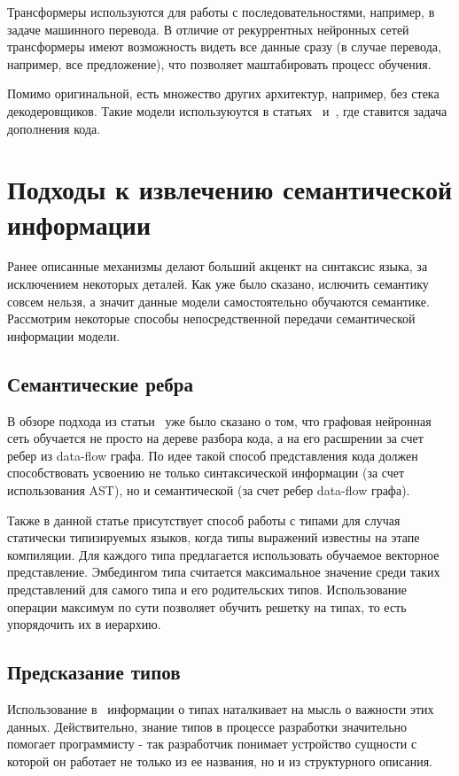 \documentclass[times,specification,annotation]{itmo-student-thesis}
\begin{document}
Трансформеры используются для работы с последовательностями, например, в задаче машинного перевода. В отличие от рекуррентных нейронных сетей трансформеры имеют возможность видеть все данные сразу (в случае перевода, например, все предложение), что позволяет маштабировать процесс обучения.

Помимо оригинальной, есть множество других архитектур, например, без стека декодеровщиков. Такие модели используюутся в статьях~\cite{intelli} и~\cite{slm}, где ставится задача дополнения кода.

\section{Подходы к извлечению семантической информации}\label{sec:semantic}
Ранее описанные механизмы делают больший акценкт на синтаксис языка, за исключением некоторых деталей. Как уже было сказано, ислючить семантику совсем нельзя, а значит данные модели самостоятельно обучаются семантике. Рассмотрим некоторые способы непосредственной передачи семантической информации модели.

\subsection{Семантические ребра}\label{sec:semanticEdges}
В обзоре подхода из статьи~\cite{gated-graphs-nn} уже было сказано о том, что графовая нейронная сеть обучается не просто на дереве разбора кода, а на его расшрении за счет ребер из data-flow графа. По идее такой способ представления кода должен способствовать усвоению не только синтаксической информации (за счет использования AST), но и семантической (за счет ребер data-flow графа).

Также в данной статье присутствует способ работы с типами для случая статически типизируемых языков, когда типы выражений известны на этапе компиляции. Для каждого типа предлагается использовать обучаемое векторное представление. Эмбедингом типа считается максимальное значение среди таких представлений для самого типа и его родительских типов. Использование операции максимум по сути позволяет обучить решетку на типах, то есть упорядочить их в иерархию.

\subsection{Предсказание типов}\label{sec:lambdanet}
Использование в~\cite{gated-graphs-nn} информации о типах наталкивает на мысль о важности этих данных. Действительно, знание типов в процессе разработки значительно помогает программисту - так разработчик понимает устройство сущности с которой он работает не только из ее названия, но и из структурного описания. 
\end{document}
